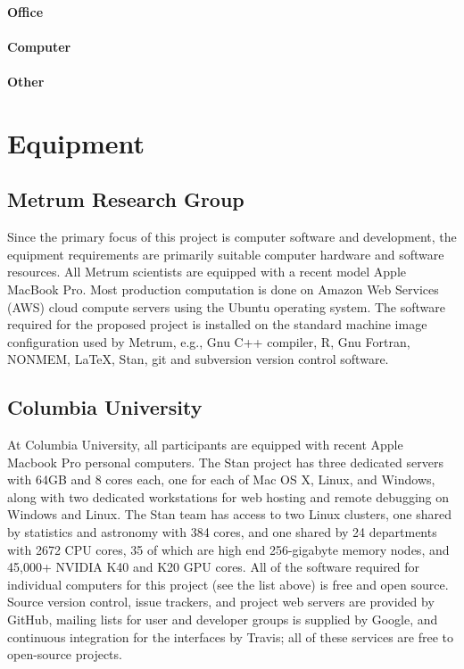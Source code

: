 \documentclass[11pt]{article}
\begin{document}
\paragraph{Office}

\paragraph{Computer}

\paragraph{Other}

\clearpage
\section*{Equipment}

\subsection*{Metrum Research Group}

Since the primary focus of this project is computer software and
development, the equipment requirements are primarily suitable
computer hardware and software resources. All Metrum scientists are
equipped with a recent model Apple MacBook Pro. Most production
computation is done on Amazon Web Services (AWS) cloud compute servers
using the Ubuntu operating system. The software required for the
proposed project is installed on the standard machine image
configuration used by Metrum, e.g., Gnu C++ compiler, R, Gnu Fortran,
NONMEM, LaTeX, Stan, git and subversion version control software.

\subsection*{Columbia University}

At Columbia University, all participants are equipped with recent
Apple Macbook Pro personal computers.  The Stan project has three
dedicated servers with 64GB and 8 cores each, one for each of Mac OS
X, Linux, and Windows, along with two dedicated workstations for web
hosting and remote debugging on Windows and Linux.  The Stan team has
access to two Linux clusters, one shared by statistics and astronomy
with 384 cores, and one shared by 24 departments with 2672 CPU cores,
35 of which are high end 256-gigabyte memory nodes, and 45,000+ NVIDIA
K40 and K20 GPU cores.  All of the software required for individual
computers for this project (see the list above) is free and open
source.  Source version control, issue trackers, and project web
servers are provided by GitHub, mailing lists for user and developer
groups is supplied by Google, and continuous integration for the
interfaces by Travis;  all of these services are free to open-source
projects.
\end{document}
